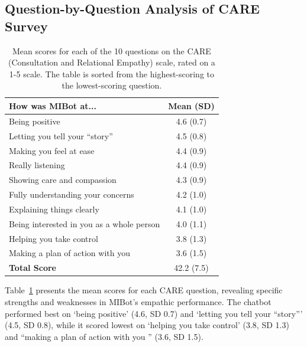 \subsection{Question-by-Question Analysis of CARE Survey}
\begin{table}[ht]
  \centering
  \small
  \setlength{\tabcolsep}{3pt}
  \renewcommand{\arraystretch}{1.1}
  \begin{tabular}{@{}lc@{}}
    \toprule
    \textbf{How was MIBot at...} & \textbf{Mean (SD)} \\
    \midrule
    Being positive & 4.6 (0.7) \\
    Letting you tell your ``story'' & 4.5 (0.8) \\
    Making you feel at ease & 4.4 (0.9) \\
    Really listening & 4.4 (0.9) \\
    Showing care and compassion & 4.3 (0.9) \\
    Fully understanding your concerns & 4.2 (1.0) \\
    Explaining things clearly & 4.1 (1.0) \\
    Being interested in you as a whole person & 4.0 (1.1) \\
    Helping you take control & 3.8 (1.3) \\
    Making a plan of action with you & 3.6 (1.5) \\
    \midrule
    \textbf{Total Score} & 42.2 (7.5) \\
    \bottomrule
  \end{tabular}
  \caption[Mean CARE Scores per Question]{Mean scores for each of the 10 questions on the CARE (Consultation and Relational Empathy) scale, rated on a 1-5 scale. The table is sorted from the highest-scoring to the lowest-scoring question.}
  \label{table:care_question_means}
\end{table}
Table~\ref{table:care_question_means} presents the mean scores for each CARE question, revealing specific strengths and weaknesses in MIBot's empathic performance. The chatbot performed best on `being positive' (4.6, SD 0.7) and `letting you tell your ``story''' (4.5, SD 0.8), while it scored lowest on `helping you take control' (3.8, SD 1.3) and ``making a plan of action with you '' (3.6, SD 1.5).


